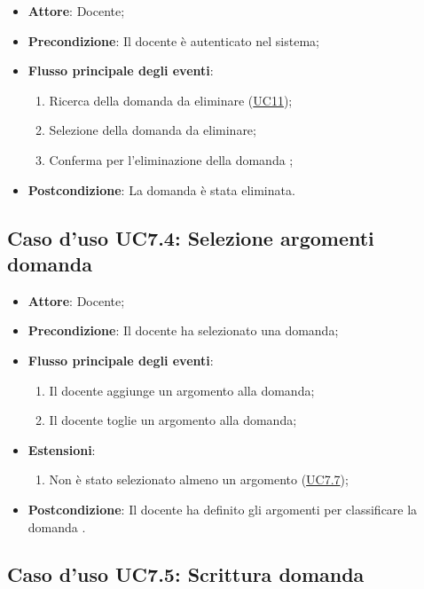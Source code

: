 \documentclass[12pt,a4paper]{article}
\begin{document}
\begin{itemize}

\item \textbf{Attore}: Docente; 
\item \textbf{Precondizione}: Il docente è autenticato nel sistema;

\item \textbf{Flusso principale degli eventi}:
\begin{enumerate}
	\item Ricerca della domanda da eliminare (\hyperlink{UC11}{UC11});
	\item Selezione della domanda da eliminare;
	\item Conferma per l'eliminazione della domanda	;
	
\end{enumerate}
\item \textbf{Postcondizione}: La domanda è stata eliminata.
\end{itemize}
\hypertarget{UC7.4}{}
\subsection{Caso d'uso UC7.4: Selezione argomenti domanda}

\begin{itemize}

\item \textbf{Attore}: Docente; 
\item \textbf{Precondizione}: Il docente ha selezionato una domanda;

\item \textbf{Flusso principale degli eventi}:
\begin{enumerate}
	\item Il docente aggiunge un argomento alla domanda;
	\item Il docente toglie un argomento alla domanda;
	
\end{enumerate}
\item \textbf{Estensioni}:
\begin{enumerate}
	\item Non è stato selezionato almeno un argomento (\hyperlink{UC7.7}{UC7.7});
	
\end{enumerate}
\item \textbf{Postcondizione}: Il docente ha definito gli argomenti per classificare la domanda
.
\end{itemize}
\hypertarget{UC7.5}{}
\subsection{Caso d'uso UC7.5: Scrittura domanda}
\end{document}

